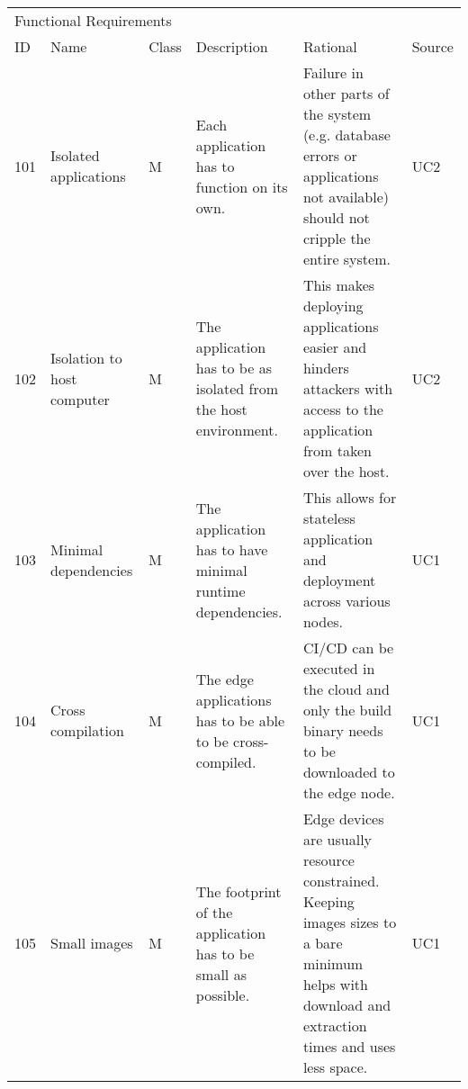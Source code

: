 
\begin{longtable}{l p{2cm} p{0.8cm} p{3.6cm} p{4.5cm} p{0.8cm} }
\multicolumn{6}{l}{Functional Requirements}\\

ID                      & Name                                    & Class & Description    & Rational       & Source     \\\hline



101                     & Isolated applications                   & M     & Each application has to function on its own.                                                                                                                     & Failure in other parts of the system (e.g. database errors or applications not available) should not cripple the entire system.                                                   & UC2    \\
102                     & Isolation to host computer              & M     & The application has to be as isolated from the host environment.                                                                                                 & This makes deploying applications easier and hinders attackers with access to the application from taken over the host.                                                           & UC2    \\
103                     & Minimal dependencies                    & M     & The application has to have minimal runtime dependencies.                                                                                                        & This allows for stateless application and deployment across various nodes.                                                                                                        & UC1    \\
104                     & Cross compilation                       & M     & The edge applications has to be able to be cross-compiled.                                                                                                       & CI/CD can be executed in the cloud and only the build binary needs to be downloaded to the edge node.                                                                             & UC1    \\
105                     & Small images                            & M     & The footprint of the application has to be small as possible.                                                                                                    & Edge devices are usually resource constrained. Keeping images sizes to a bare minimum helps with download and extraction times and uses less space.                               & UC1    \\

\end{longtable}
